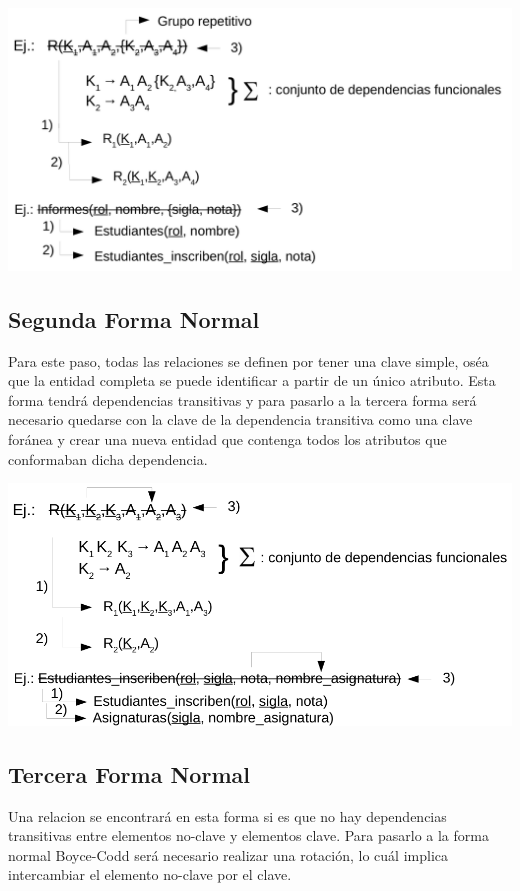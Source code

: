 \documentclass[12pt]{article}
\begin{document}
\begin{center}
\includegraphics[scale=0.25]{1FN.png}
\end{center}

\subsection{Segunda Forma Normal}
Para este paso, todas las relaciones se definen por tener una clave simple, oséa que la
entidad completa se puede identificar a partir de un único atributo. Esta forma tendrá
dependencias transitivas y para pasarlo a la tercera forma será necesario quedarse con
la clave de la dependencia transitiva como una clave foránea y crear una nueva entidad
que contenga todos los atributos que conformaban dicha dependencia.

\begin{center}
\includegraphics[scale=0.25]{2FN.png}
\end{center}

\subsection{Tercera Forma Normal}
Una relacion se encontrará en esta forma si es que no hay dependencias transitivas
entre elementos no-clave y elementos clave. Para pasarlo a la forma normal Boyce-Codd 
será necesario realizar una rotación, lo cuál implica intercambiar el elemento
no-clave por el clave.
\end{document}
